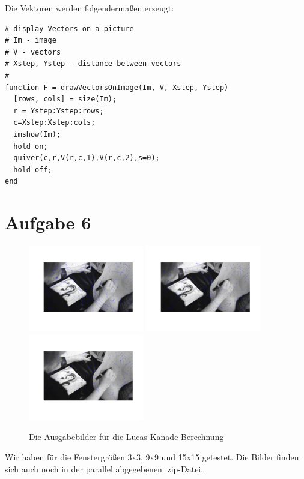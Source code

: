 Die Vektoren werden folgendermaßen erzeugt:

\lstset{language=matlab}
\begin{lstlisting}[caption={Zeichnen der Vektoren}]
# display Vectors on a picture
# Im - image
# V - vectors
# Xstep, Ystep - distance between vectors
# 
function F = drawVectorsOnImage(Im, V, Xstep, Ystep)
  [rows, cols] = size(Im);
  r = Ystep:Ystep:rows;  
  c=Xstep:Xstep:cols;
  imshow(Im);
  hold on;
  quiver(c,r,V(r,c,1),V(r,c,2),s=0);
  hold off;
end
\end{lstlisting}

\section*{Aufgabe 6}

\begin{figure}[htpb]
\begin{center}
{\includegraphics[width=0.45\textwidth]{u03.lucas-kanade/u03_pic_n03.png}}
{\includegraphics[width=0.45\textwidth]{u03.lucas-kanade/u03_pic_n09.png}}
{\includegraphics[width=0.45\textwidth]{u03.lucas-kanade/u03_pic_n15.png}}
\end{center}
\caption{Die Ausgabebilder für die Lucas-Kanade-Berechnung }
\label{fig:u03-t6}
\end{figure}

Wir haben für die Fenstergrößen 3x3, 9x9 und 15x15 getestet. Die Bilder finden sich auch noch in der parallel abgegebenen .zip-Datei.


